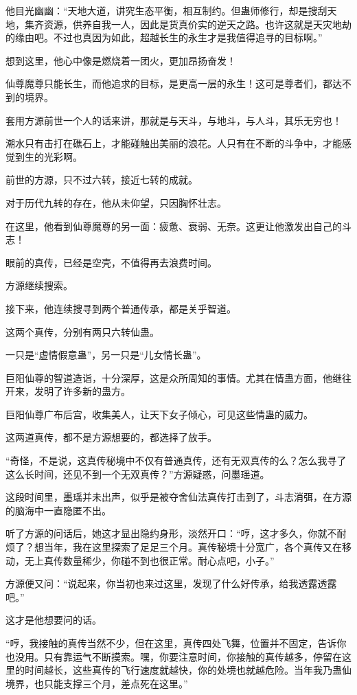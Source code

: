 \begin{this_body}
他目光幽幽：“天地大道，讲究生态平衡，相互制约。但蛊师修行，却是搜刮天地，集齐资源，供养自我一人，因此是货真价实的逆天之路。也许这就是天灾地劫的缘由吧。不过也真因为如此，超越长生的永生才是我值得追寻的目标啊。”

想到这里，他心中像是燃烧着一团火，更加昂扬奋发！

仙尊魔尊只能长生，而他追求的目标，是更高一层的永生！这可是尊者们，都达不到的境界。

套用方源前世一个人的话来讲，那就是与天斗，与地斗，与人斗，其乐无穷也！

潮水只有击打在礁石上，才能碰触出美丽的浪花。人只有在不断的斗争中，才能感觉到生的光彩啊。

前世的方源，只不过六转，接近七转的成就。

对于历代九转的存在，他从未仰望，只因胸怀壮志。

在这里，他看到仙尊魔尊的另一面：疲惫、衰弱、无奈。这更让他激发出自己的斗志！

眼前的真传，已经是空壳，不值得再去浪费时间。

方源继续搜索。

接下来，他连续搜寻到两个普通传承，都是关乎智道。

这两个真传，分别有两只六转仙蛊。

一只是“虚情假意蛊”，另一只是“儿女情长蛊”。

巨阳仙尊的智道造诣，十分深厚，这是众所周知的事情。尤其在情蛊方面，他继往开来，发明了许多新的蛊方。

巨阳仙尊广布后宫，收集美人，让天下女子倾心，可见这些情蛊的威力。

这两道真传，都不是方源想要的，都选择了放手。

“奇怪，不是说，这真传秘境中不仅有普通真传，还有无双真传的么？怎么我寻了这么长时间，还见不到一个无双真传？”方源疑惑，问墨瑶道。

这段时间里，墨瑶并未出声，似乎是被夺舍仙法真传打击到了，斗志消弭，在方源的脑海中一直隐匿不出。

听了方源的问话后，她这才显出隐约身形，淡然开口：“哼，这才多久，你就不耐烦了？想当年，我在这里探索了足足三个月。真传秘境十分宽广，各个真传又在移动，无上真传数量稀少，你碰不到也很正常。耐心点吧，小子。”

方源便又问：“说起来，你当初也来过这里，发现了什么好传承，给我透露透露吧。”

这才是他想要问的话。

“哼，我接触的真传当然不少，但在这里，真传四处飞舞，位置并不固定，告诉你也没用。只有靠运气不断摸索。嘿，你要注意时间，你接触的真传越多，停留在这里的时间越长，这些真传的飞行速度就越快，你的处境也就越危险。当年我乃蛊仙境界，也只能支撑三个月，差点死在这里。”


\end{this_body}

